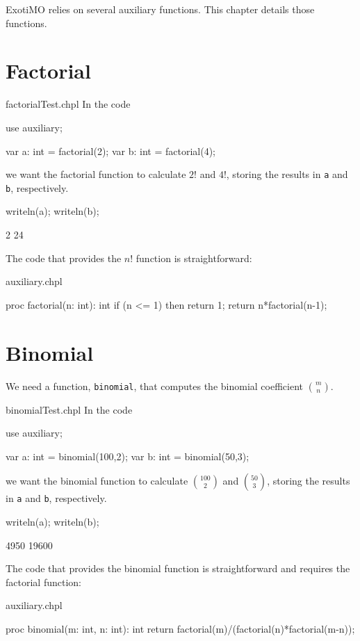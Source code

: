 \label{Auxiliary_Functions}

ExotiMO relies on several auxiliary functions. This chapter details those functions.

\section{Factorial}

\begin{chapelexample}{factorialTest.chpl}
In the code
\begin{chapelpre}
use auxiliary;
\end{chapelpre}
\begin{chapel}
var a: int = factorial(2);
var b: int = factorial(4);
\end{chapel}
we want the factorial function to calculate $2!$ and $4!$, storing the results in \lstinline{a}
and \lstinline{b}, respectively.
\begin{chapelpost}
writeln(a);
writeln(b);
\end{chapelpost}
\begin{chapeloutput}
2
24
\end{chapeloutput}
\end{chapelexample}

The code that provides the $n!$ function is straightforward:
\begin{chapelsource}{auxiliary.chpl}
\begin{chapel}
proc factorial(n: int): int{
  if (n <= 1) then return 1;
  return n*factorial(n-1);
}
\end{chapel}
\end{chapelsource}


\section{Binomial}

We need a function, \lstinline{binomial}, that computes the binomial coefficient $\binom{m}{n}$.
\begin{chapelexample}{binomialTest.chpl}
In the code
\begin{chapelpre}
use auxiliary;
\end{chapelpre}
\begin{chapel}
var a: int = binomial(100,2);
var b: int = binomial(50,3);
\end{chapel}
we want the binomial function to calculate $\binom{100}{2}$ and $\binom{50}{3}$, storing the results in \lstinline{a}
and \lstinline{b}, respectively.
\begin{chapelpost}
writeln(a);
writeln(b);
\end{chapelpost}
\begin{chapeloutput}
4950
19600
\end{chapeloutput}
\end{chapelexample}

The code that provides the binomial function is straightforward and requires the factorial function:
\begin{chapelsource}{auxiliary.chpl}
\begin{chapel}
proc binomial(m: int, n: int): int {
  return factorial(m)/(factorial(n)*factorial(m-n));
}
\end{chapel}
\end{chapelsource}


